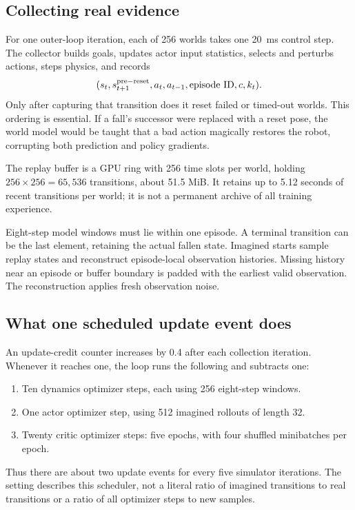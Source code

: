 \documentclass[11pt,a4paper]{article}
\newcommand{\code}[1]{\texttt{\small\detokenize{#1}}}
\begin{document}
\subsection{Collecting real evidence}
For one outer-loop iteration, each of 256 worlds takes one 20~ms control step.
The collector builds goals, updates actor input statistics, selects and perturbs
actions, steps physics, and records
\begin{equation}
(s_t,s_{t+1}^{\rm pre-reset},a_t,a_{t-1},\text{episode ID},c,k_t).
\end{equation}
Only after capturing that transition does it reset failed or timed-out worlds.
This ordering is essential. If a fall's successor were replaced with a reset
pose, the world model would be taught that a bad action magically restores the
robot, corrupting both prediction and policy gradients.

The replay buffer is a GPU ring with 256 time slots per world, holding
$256\times256=65{,}536$ transitions, about 51.5 MiB. It retains up to 5.12 seconds
of recent transitions per world; it is not a permanent archive of all training
experience.

Eight-step model windows must lie within one episode. A terminal transition can
be the last element, retaining the actual fallen state. Imagined starts sample
replay states and reconstruct episode-local observation histories. Missing
history near an episode or buffer boundary is padded with the earliest valid
observation. The reconstruction applies fresh observation noise.

\subsection{What one scheduled update event does}
An update-credit counter increases by 0.4 after each collection iteration.
Whenever it reaches one, the loop runs the following and subtracts one:
\begin{enumerate}
\item Ten dynamics optimizer steps, each using 256 eight-step windows.
\item One actor optimizer step, using 512 imagined rollouts of length 32.
\item Twenty critic optimizer steps: five epochs, with four shuffled minibatches per epoch.
\end{enumerate}
Thus there are about two update events for every five simulator iterations.
The setting \code{utd=0.4} describes this scheduler, not a literal ratio of
imagined transitions to real transitions or a ratio of all optimizer steps to
new samples.
\end{document}
